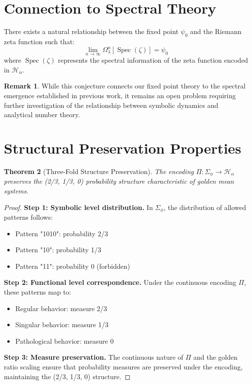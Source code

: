 \documentclass[12pt]{article}
\theoremstyle{plain}
\newtheorem{theorem}{Theorem}[section]
\theoremstyle{definition}
\newtheorem{remark}[theorem]{Remark}
\DeclareMathOperator{\Spec}{Spec}
\begin{document}
\section{Connection to Spectral Theory}

\begin{conjecture}
\label{conj:spectral}
There exists a natural relationship between the fixed point $\psi_0$ and the Riemann zeta function such that:
$$\lim_{n \to \infty} \Omega_\lambda^n[\Spec(\zeta)] = \psi_0$$
where $\Spec(\zeta)$ represents the spectral information of the zeta function encoded in $\mathcal{H}_\alpha$.
\end{conjecture}

\begin{remark}
While this conjecture connects our fixed point theory to the spectral emergence established in previous work, it remains an open problem requiring further investigation of the relationship between symbolic dynamics and analytical number theory.
\end{remark}

\section{Structural Preservation Properties}

\begin{theorem}[Three-Fold Structure Preservation]
\label{thm:structure-preservation}
The encoding $\Pi: \Sigma_\phi \to \mathcal{H}_\alpha$ preserves the (2/3, 1/3, 0) probability structure characteristic of golden mean systems.
\end{theorem}

\begin{proof}
\textbf{Step 1: Symbolic level distribution.}
In $\Sigma_\phi$, the distribution of allowed patterns follows:
\begin{itemize}
\item Pattern "1010": probability 2/3
\item Pattern "10": probability 1/3  
\item Pattern "11": probability 0 (forbidden)
\end{itemize}

\textbf{Step 2: Functional level correspondence.}
Under the continuous encoding $\Pi$, these patterns map to:
\begin{itemize}
\item Regular behavior: measure 2/3
\item Singular behavior: measure 1/3
\item Pathological behavior: measure 0
\end{itemize}

\textbf{Step 3: Measure preservation.}
The continuous nature of $\Pi$ and the golden ratio scaling ensure that probability measures are preserved under the encoding, maintaining the (2/3, 1/3, 0) structure.
\end{proof}
\end{document}
